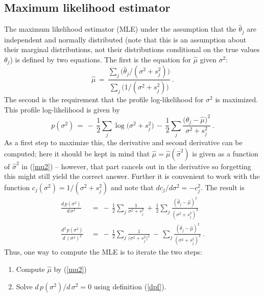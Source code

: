 \documentclass[a4paper,12pt,fleqn]{article}
\begin{document}
\subsection{Maximum likelihood estimator}
\label{S_metamle}

The maximum likelihood estimator (MLE)
under the assumption that the $\hat\theta_j$ are independent and normally
distributed (note that this is an assumption about their marginal
distributions, not their distributions conditional on
the true values $\theta_j$)
is defined by two equations.
The first is the equation for $\hat\mu$ given ${\sigma}^2 $:
\begin{equation}
 {\hat{\mu}} \,=\,
       \frac{ \sum_j \big( {\hat{\theta}}_j / (\sigma^2
                    + s^2_j ) \big) }
            { \sum_j \big( 1/({\sigma}^2 + s^2_j ) \big)} \ .
                                               \label{mu2}
\end{equation}
The second is the requirement that the profile log-likelihood for $\sigma^2$
is maximized. This profile log-likelihood is given by
\begin{equation}
  p(\sigma^2) \,=\, - \,  \frac12 \sum_j \log\big(\sigma^2 + s_j^2) \,-\,
         \frac12 \sum_j \frac{\big(\hat\theta_j - \hat\mu\big)^2}{\sigma^2 + s_j^2} \ .
\end{equation}
As a first step to maximize this, the derivative
and second derivative can be computed; here
it should be kept in mind that $\hat\mu = \hat\mu(\hat\sigma^2)$ is given as
a function of $\hat\sigma^2$ in (\ref{mu2}) -- however, that part cancels out
in the derivative
so forgetting this might still yield the correct answer. Further it is
convenient to work with the function $c_j(\sigma^2) = 1/(\sigma^2 + s_j^2)$
and note that $dc_j/d\sigma^2 = - c_j^2$. The result is
\begin{align}
\frac{d\, p(\sigma^2)}{d\,\sigma^2} \ &= \
     - \, \frac12 \sum_j \frac{1}{\sigma^2 + s_j^2} \,+\,
     \frac12 \sum_j \frac{(\hat\theta_j - \hat\mu)^2}{(\sigma^2 + s_j^2)^2}
                                     \label{dpf} \\
\frac{d^2\, p(\sigma^2)}{d\,(\sigma^2)^2} \ &= \
     - \, \frac12 \sum_j \frac{1}{\big(\sigma^2 + s_j^2\big)^2} \,-\,
           \sum_j \frac{(\hat\theta_j - \hat\mu)^2}{(\sigma^2 + s_j^2)^3} \ .
                     \label{dpf2}
\end{align}
Thus, one way to compute the MLE is to iterate the two steps:
\begin{enumerate}
\item Compute $\hat\mu$ by (\ref{mu2})
\item Solve ${d\, p(\sigma^2)}/{d\,\sigma^2} = 0$ using definition (\ref{dpf}).
\end{enumerate}
\end{document}
